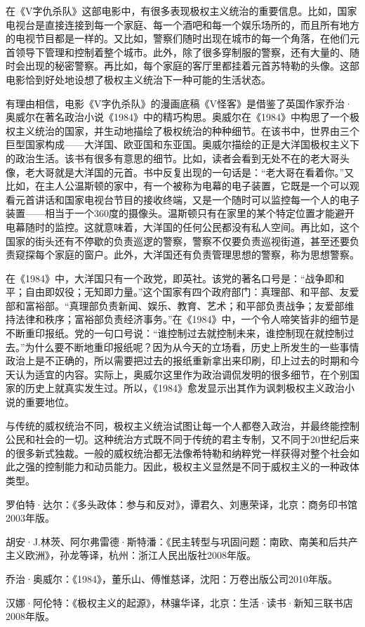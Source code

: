 在《V字仇杀队》这部电影中，有很多表现极权主义统治的重要信息。比如，国家电视台是直接连接到每一个家庭、每一个酒吧和每一个娱乐场所的，而且所有地方的电视节目都是一样的。又比如，警察们随时出现在城市的每一个角落，在他们元首领导下管理和控制着整个城市。此外，除了很多穿制服的警察，还有大量的、随时会出现的秘密警察。再比如，每个家庭的客厅里都挂着元首苏特勒的头像。这部电影恰到好处地设想了极权主义统治下一种可能的生活状态。

有理由相信，电影《V字仇杀队》的漫画底稿《V怪客》是借鉴了英国作家乔治·奥威尔在著名政治小说《1984》中的精巧构思。奥威尔在《1984》中构思了一个极权主义统治的国家，并生动地描绘了极权统治的种种细节。在该书中，世界由三个巨型国家构成——大洋国、欧亚国和东亚国。奥威尔描绘的正是大洋国极权主义下的政治生活。该书有很多有意思的细节。比如，读者会看到无处不在的老大哥头像，老大哥就是大洋国的元首。书中反复出现的一句话是：“老大哥在看着你。”又比如，在主人公温斯顿的家中，有一个被称为电幕的电子装置，它既是一个可以观看元首讲话和国家电视台节目的接收终端，又是一个随时可以监控每一个人的电子装置——相当于一个360度的摄像头。温斯顿只有在家里的某个特定位置才能避开电幕随时的监控。这就意味着，大洋国的任何公民都没有私人空间。再比如，这个国家的街头还有不停歇的负责巡逻的警察，警察不仅要负责巡视街道，甚至还要负责窥探每个家庭的窗户。此外，大洋国还有负责管理思想的警察，称为思想警察。

在《1984》中，大洋国只有一个政党，即英社。该党的著名口号是：“战争即和平；自由即奴役；无知即力量。”这个国家有四个政府部门：真理部、和平部、友爱部和富裕部。“真理部负责新闻、娱乐、教育、艺术；和平部负责战争；友爱部维持法律和秩序；富裕部负责经济事务。”在《1984》中，一个令人啼笑皆非的细节是不断重印报纸。党的一句口号说：“谁控制过去就控制未来，谁控制现在就控制过去。”为什么要不断地重印报纸呢？因为从今天的立场看，历史上所发生的一些事情政治上是不正确的，所以需要把过去的报纸重新拿出来印刷，印上过去的时期和今天认为适宜的内容。实际上，奥威尔这里作为政治调侃发明的很多细节，在个别国家的历史上就真实发生过。所以，《1984》愈发显示出其作为讽刺极权主义政治小说的重要地位。

与传统的威权统治不同，极权主义统治试图让每一个人都卷入政治，并最终能控制公民和社会的一切。这种统治方式既不同于传统的君主专制，又不同于20世纪后来的很多新式独裁。一般的威权统治都无法像希特勒和纳粹党一样获得对整个社会如此之强的控制能力和动员能力。因此，极权主义显然是不同于威权主义的一种政体类型。


罗伯特·达尔：《多头政体：参与和反对》，谭君久、刘惠荣译，北京：商务印书馆2003年版。

胡安·J.林茨、阿尔弗雷德·斯特潘：《民主转型与巩固问题：南欧、南美和后共产主义欧洲》，孙龙等译，杭州：浙江人民出版社2008年版。

乔治·奥威尔：《1984》，董乐山、傅惟慈译，沈阳：万卷出版公司2010年版。

汉娜·阿伦特：《极权主义的起源》，林骧华译，北京：生活·读书·新知三联书店2008年版。
